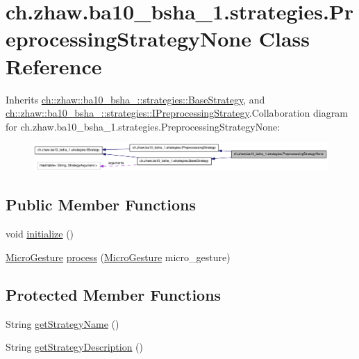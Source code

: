 \hypertarget{classch_1_1zhaw_1_1ba10__bsha__1_1_1strategies_1_1PreprocessingStrategyNone}{
\section{ch.zhaw.ba10\_\-bsha\_\-1.strategies.PreprocessingStrategyNone Class Reference}
\label{classch_1_1zhaw_1_1ba10__bsha__1_1_1strategies_1_1PreprocessingStrategyNone}
}


Inherits \hyperlink{classch_1_1zhaw_1_1ba10__bsha__1_1_1strategies_1_1BaseStrategy}{ch::zhaw::ba10\_\-bsha\_::strategies::BaseStrategy}, and \hyperlink{interfacech_1_1zhaw_1_1ba10__bsha__1_1_1strategies_1_1IPreprocessingStrategy}{ch::zhaw::ba10\_\-bsha\_::strategies::IPreprocessingStrategy}.Collaboration diagram for ch.zhaw.ba10\_\-bsha\_\-1.strategies.PreprocessingStrategyNone:\nopagebreak
\begin{figure}[H]
\begin{center}
\leavevmode
\includegraphics[width=400pt]{classch_1_1zhaw_1_1ba10__bsha__1_1_1strategies_1_1PreprocessingStrategyNone__coll__graph}
\end{center}
\end{figure}
\subsection*{Public Member Functions}
\begin{DoxyCompactItemize}
\item 
void \hyperlink{classch_1_1zhaw_1_1ba10__bsha__1_1_1strategies_1_1PreprocessingStrategyNone_a76d2204685b040adc9183d5ea705ef8c}{initialize} ()
\item 
\hyperlink{classch_1_1zhaw_1_1ba10__bsha__1_1_1service_1_1MicroGesture}{MicroGesture} \hyperlink{classch_1_1zhaw_1_1ba10__bsha__1_1_1strategies_1_1PreprocessingStrategyNone_ac69d173a141370d7fe5c3dd96021a558}{process} (\hyperlink{classch_1_1zhaw_1_1ba10__bsha__1_1_1service_1_1MicroGesture}{MicroGesture} micro\_\-gesture)
\end{DoxyCompactItemize}
\subsection*{Protected Member Functions}
\begin{DoxyCompactItemize}
\item 
String \hyperlink{classch_1_1zhaw_1_1ba10__bsha__1_1_1strategies_1_1PreprocessingStrategyNone_ae9f3b294f1a1d8b53e604256cc0a796f}{getStrategyName} ()
\item 
String \hyperlink{classch_1_1zhaw_1_1ba10__bsha__1_1_1strategies_1_1PreprocessingStrategyNone_aa9acb726892bd3fb6641de865c60cfed}{getStrategyDescription} ()
\end{DoxyCompactItemize}


